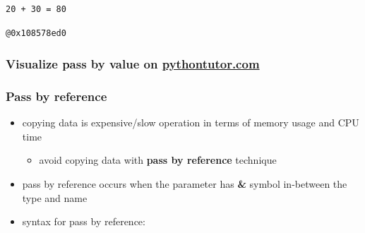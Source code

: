 \documentclass[11pt]{article}
\makeatletter
\providecommand{\tightlist}{%
      \setlength{\itemsep}{0pt}\setlength{\parskip}{0pt}}
\newcommand{\boxspacing}{\kern\kvtcb@left@rule\kern\kvtcb@boxsep}
\newcommand{\prompt}[4]{
        {\ttfamily\llap{{\color{#2}[#3]:\hspace{3pt}#4}}\vspace{-\baselineskip}}
    }
\makeatother
\begin{document}
    \begin{Verbatim}[commandchars=\\\{\}]
20 + 30 = 80
    \end{Verbatim}

            \begin{tcolorbox}[breakable, size=fbox, boxrule=.5pt, pad at break*=1mm, opacityfill=0]
\prompt{Out}{outcolor}{28}{\boxspacing}
\begin{Verbatim}[commandchars=\\\{\}]
@0x108578ed0
\end{Verbatim}
\end{tcolorbox}
        
    \hypertarget{visualize-pass-by-value-on-pythontutor.com}{%
\subsubsection{\texorpdfstring{Visualize pass by value on
\href{http://pythontutor.com/cpp.html\#code=//\%20pass\%20by\%20value\%20demo\%0A\%23include\%20\%3Ciostream\%3E\%0Ausing\%20namespace\%20std\%3B\%0A\%0Along\%20sum\%28int\%20num1,\%20int\%20num2\%29\%20\%7B\%0A\%20\%20num1\%20\%2B\%3D\%2010\%3B\%0A\%20\%20num2\%20\%2B\%3D\%2020\%3B\%0A\%20\%20long\%20total\%20\%3D\%20num1\%20\%2B\%20num2\%3B\%0A\%20\%20return\%20total\%3B\%0A\%7D\%0A\%0Aint\%20main\%28\%29\%20\%7B\%0A\%20\%20int\%20n1,\%20n2\%3B\%0A\%20\%20n1\%20\%3D\%2020\%3B\%0A\%20\%20n2\%20\%3D\%2030\%3B\%0A\%20\%20cout\%20\%3C\%3C\%20n1\%20\%3C\%3C\%20\%22\%20\%2B\%20\%22\%20\%3C\%3C\%20n2\%20\%3C\%3C\%20\%22\%20\%3D\%20\%22\%20\%3C\%3C\%20sum\%28n1,\%20n2\%29\%20\%3C\%3C\%20endl\%3B\%0A\%20\%20//\%20n1\%20and\%20n2\%20still\%20have\%20same\%20original\%20values\%0A\%20\%20return\%200\%3B\%0A\%7D\&curInstr=0\&mode=display\&origin=opt-frontend.js\&py=cpp\&rawInputLstJSON=\%5B\%5D}{pythontutor.com}}{Visualize pass by value on pythontutor.com}}\label{visualize-pass-by-value-on-pythontutor.com}}

\hypertarget{pass-by-reference}{%
\subsubsection{Pass by reference}\label{pass-by-reference}}

\begin{itemize}
\tightlist
\item
  copying data is expensive/slow operation in terms of memory usage and
  CPU time

  \begin{itemize}
  \tightlist
  \item
    avoid copying data with \textbf{pass by reference} technique
  \end{itemize}
\item
  pass by reference occurs when the parameter has \textbf{\&} symbol
  in-between the type and name
\item
  syntax for pass by reference:
\end{itemize}
\end{document}
